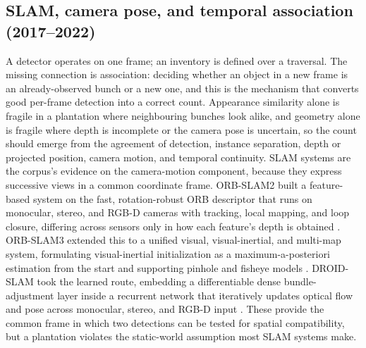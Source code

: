 \subsection{SLAM, camera pose, and temporal association (2017--2022)}

A detector operates on one frame; an inventory is defined over a traversal. The missing connection is association: deciding whether an object in a new frame is an already-observed bunch or a new one, and this is the mechanism that converts good per-frame detection into a correct count. Appearance similarity alone is fragile in a plantation where neighbouring bunches look alike, and geometry alone is fragile where depth is incomplete or the camera pose is uncertain, so the count should emerge from the agreement of detection, instance separation, depth or projected position, camera motion, and temporal continuity. SLAM systems are the corpus's evidence on the camera-motion component, because they express successive views in a common coordinate frame. ORB-SLAM2 built a feature-based system on the fast, rotation-robust ORB descriptor that runs on monocular, stereo, and RGB-D cameras with tracking, local mapping, and loop closure, differing across sensors only in how each feature's depth is obtained \cite{murartal2017orbslam2}. ORB-SLAM3 extended this to a unified visual, visual-inertial, and multi-map system, formulating visual-inertial initialization as a maximum-a-posteriori estimation from the start and supporting pinhole and fisheye models \cite{campos2021orbslam3}. DROID-SLAM took the learned route, embedding a differentiable dense bundle-adjustment layer inside a recurrent network that iteratively updates optical flow and pose across monocular, stereo, and RGB-D input \cite{teed2021droidslam}. These provide the common frame in which two detections can be tested for spatial compatibility, but a plantation violates the static-world assumption most SLAM systems make.

